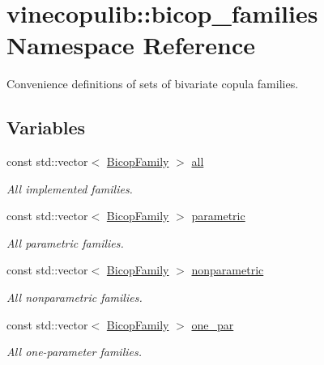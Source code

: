 \hypertarget{namespacevinecopulib_1_1bicop__families}{}\section{vinecopulib\+:\+:bicop\+\_\+families Namespace Reference}
\label{namespacevinecopulib_1_1bicop__families}


Convenience definitions of sets of bivariate copula families.  


\subsection*{Variables}
\begin{DoxyCompactItemize}
\item 
const std\+::vector$<$ \hyperlink{namespacevinecopulib_a42e95cc06d33896199caab0c11ad44f3}{Bicop\+Family} $>$ \hyperlink{namespacevinecopulib_1_1bicop__families_a5214a513f41ec23b74782aab96ea6774}{all}
\begin{DoxyCompactList}\small\item\em All implemented families. \end{DoxyCompactList}\item 
const std\+::vector$<$ \hyperlink{namespacevinecopulib_a42e95cc06d33896199caab0c11ad44f3}{Bicop\+Family} $>$ \hyperlink{namespacevinecopulib_1_1bicop__families_a76d66bb6cb03ae4de1cef3d1ed70ac16}{parametric}
\begin{DoxyCompactList}\small\item\em All parametric families. \end{DoxyCompactList}\item 
const std\+::vector$<$ \hyperlink{namespacevinecopulib_a42e95cc06d33896199caab0c11ad44f3}{Bicop\+Family} $>$ \hyperlink{namespacevinecopulib_1_1bicop__families_a01c7c990cc34b1b74d115858a52fcdc5}{nonparametric}
\begin{DoxyCompactList}\small\item\em All nonparametric families. \end{DoxyCompactList}\item 
const std\+::vector$<$ \hyperlink{namespacevinecopulib_a42e95cc06d33896199caab0c11ad44f3}{Bicop\+Family} $>$ \hyperlink{namespacevinecopulib_1_1bicop__families_aba503484b0a13cfb0e67c026e2f295d4}{one\+\_\+par}
\begin{DoxyCompactList}\small\item\em All one-\/parameter families. \end{DoxyCompactList}\item 

\end{DoxyCompactItemize}
